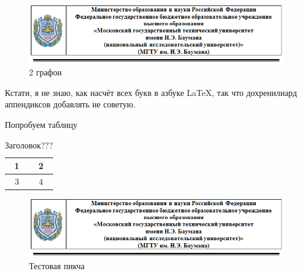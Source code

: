 \documentclass{article}
\begin{document}
\begin{figure}[h!]
	\centering
	\includegraphics[width=0.7\linewidth]{For_title}
	\caption{2 графон}
	\label{fig:app2}
\end{figure}

\Appendix

Кстати, я не знаю, как насчёт всех букв в азбуке \LaTeX, так что дохренилиард аппендиксов добавлять не советую.

Попробуем таблицу

\begin{table}[h!]
	\caption{Заголовок???}
	\centering
	\begin{tabular}{|c|c|}
		\hline 
		1 & 2 \\ 
		\hline 
		3 & 4 \\ 
		\hline 
	\end{tabular}
\label{tab:tab}
\end{table}

\begin{figure}[h!]
	\centering
	\includegraphics[width=0.7\linewidth]{For_title}
	\caption{Тестовая пикча}
	\label{fig:fortitle3}
\end{figure}

\Appendix


\Finish
\end{document}
